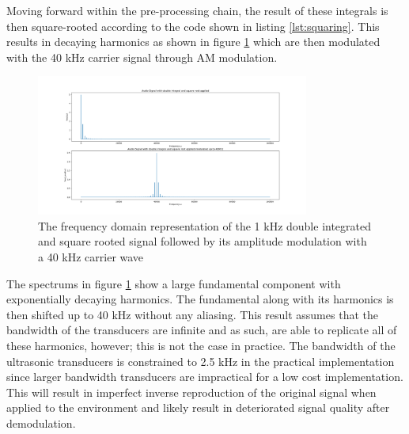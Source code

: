 Moving forward within the pre-processing chain, the result of these integrals is then square-rooted according to the code shown in listing \ref{lst:squaring}. This results in decaying harmonics as shown in figure \ref{fig:sqrtsimmodfft} which are then modulated with the 40 kHz carrier signal through AM modulation.
\begin{figure}[ht!]
    \centering
    \includegraphics[width=0.8\textwidth]{Figures/SigSimulation/sqrt_sqrtmodfft.png}
    \caption{The frequency domain representation of the 1 kHz double integrated and square rooted signal followed by its amplitude modulation with a 40 kHz carrier wave}
    \label{fig:sqrtsimmodfft}
\end{figure}
The spectrums in figure \ref{fig:sqrtsimmodfft} show a large fundamental component with exponentially decaying harmonics. The fundamental along with its harmonics is then shifted up to 40 kHz without any aliasing. This result assumes that the bandwidth of the transducers are infinite and as such, are able to replicate all of these harmonics, however; this is not the case in practice. The bandwidth of the ultrasonic transducers is constrained to 2.5 kHz in the practical implementation since larger bandwidth transducers are impractical for a low cost implementation. This will result in imperfect inverse reproduction of the original signal when applied to the environment and likely result in deteriorated signal quality after demodulation.
\newpage
